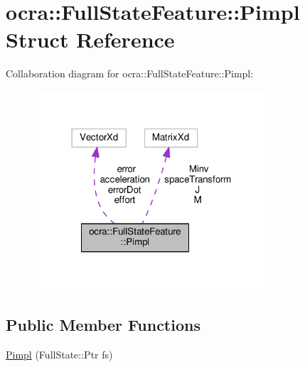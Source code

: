 \hypertarget{structocra_1_1FullStateFeature_1_1Pimpl}{}\section{ocra\+:\+:Full\+State\+Feature\+:\+:Pimpl Struct Reference}
\label{structocra_1_1FullStateFeature_1_1Pimpl}


Collaboration diagram for ocra\+:\+:Full\+State\+Feature\+:\+:Pimpl\+:
\nopagebreak
\begin{figure}[H]
\begin{center}
\leavevmode
\includegraphics[width=249pt]{dc/d7c/structocra_1_1FullStateFeature_1_1Pimpl__coll__graph}
\end{center}
\end{figure}
\subsection*{Public Member Functions}
\begin{DoxyCompactItemize}
\item 
\hyperlink{structocra_1_1FullStateFeature_1_1Pimpl_a535c4bad2a46c4c31f3b6aa052564b16}{Pimpl} (Full\+State\+::\+Ptr fs)
\end{DoxyCompactItemize}
